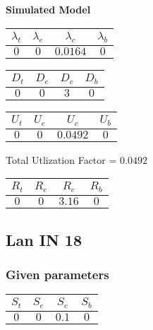 \documentclass{article}
\begin{document}
\begin{minipage}{0.5\textwidth}
\centering	\textbf{Simulated Model}
\begin{table}[H]
\centering
\begin{tabular}{@{}cccc@{}}
\toprule
$\lambda_t$ & $\lambda_e$ & $\lambda_c$ & $\lambda_b$\\
\midrule
$0$ & $0$ & $0.0164$ & $0$\\
\bottomrule
\end{tabular}
\end{table}
\begin{table}[H]
\centering
\begin{tabular}{@{}cccc@{}}
\toprule
$D_t$ & $D_e$ & $D_c$ & $D_b$\\
\midrule
$0$ & $0$ & $3$ & $0$\\
\bottomrule
\end{tabular}
\end{table}\begin{table}[H]
\centering
\begin{tabular}{@{}cccc@{}}
\toprule
$U_t$ & $U_e$ & $U_c$ & $U_b$\\
\midrule
$0$ & $0$ & $0.0492$ & $0$\\
\bottomrule
\end{tabular}
\end{table}
\centering Total Utlization Factor = $0.0492$
\begin{table}[H]
\centering
\begin{tabular}{@{}cccc@{}}
\toprule
$R_t$ & $R_e$ & $R_c$ & $R_b$\\
\midrule
$0$ & $0$ & $3.16$ & $0$\\
\bottomrule
\end{tabular}
\end{table}
\end{minipage}\subsection{Lan IN 18}
\subsubsection{Given parameters}
\begin{table}[H]
\centering
\begin{tabular}{@{}cccc@{}}
\toprule
$S_t$ & $S_e$ & $S_c$ & $S_b$\\
\midrule
$0$ & $0$ & $0.1$ & $0$\\
\bottomrule
\end{tabular}
\end{table}
\end{document}
